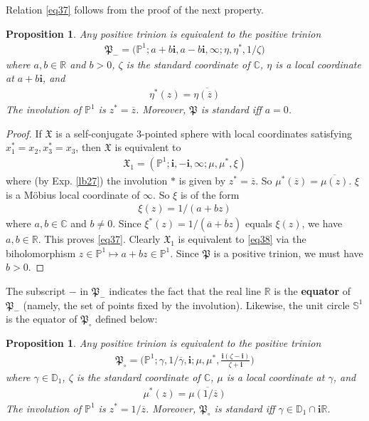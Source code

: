 \documentclass[11pt,b5paper,notitlepage]{article}
\theoremstyle{definition}
\theoremstyle{plain}
\newtheorem{pp}[df]{Proposition}
\newcommand{\fk}{\mathfrak}
\newcommand{\ovl}{\overline}
\newcommand{\im}{\mathbf{i}}
\newcommand{\Cbb}{\mathbb C}
\newcommand{\Pbb}{\mathbb P}
\newcommand{\Rbb}{\mathbb R}
\newcommand{\Dbb}{\mathbb D}
\newcommand{\Sbb}{{\mathbb S}}
\numberwithin{equation}{section}
\begin{document}
Relation \eqref{eq37} follows from the proof of the next property.

\begin{pp}\label{lb34}
Any positive trinion is equivalent to the positive trinion
\begin{align}
\fk P_-=\big(\Pbb^1;a+b\im,a-b\im,\infty;\eta,\eta^*,1/\zeta\big)  \label{eq38}
\end{align}
where $a,b\in\Rbb$ and $b>0$, $\zeta$ is the standard coordinate of $\Cbb$, $\eta$ is a local coordinate at $a+b\im$, and
\begin{align*}
\eta^*(z)=\ovl{\eta(\ovl z)}
\end{align*}
The involution of $\Pbb^1$ is $z^*=\ovl z$. Moreover, $\fk P$ is standard iff $a=0$.
\end{pp}

\begin{proof}
If $\fk X$ is a self-conjugate $3$-pointed sphere with local coordinates satisfying $x_1^*=x_2,x_3^*=x_3$, then $\fk X$ is equivalent to 
\begin{align*}
\fk X_1=(\Pbb^1;\im,-\im,\infty;\mu,\mu^*,\xi)
\end{align*}
where (by Exp. \ref{lb27}) the involution $*$ is given by $z^*=\ovl z$. So $\mu^*(\ovl z)=\ovl{\mu(z)}$. $\xi$ is a M\"obius local coordinate of $\infty$. So $\xi$ is of the form
\begin{align*}
\xi(z)=1/(a+bz)
\end{align*}
where $a,b\in\Cbb$ and $b\neq 0$. Since $\xi^*(z)=1/(\ovl a+\ovl bz)$ equals $\xi(z)$, we have $a,b\in\Rbb$. This proves \eqref{eq37}. Clearly $\fk X_1$ is equivalent to \eqref{eq38} via the biholomorphism $z\in\Pbb^1\mapsto a+bz\in\Pbb^1$. Since $\fk P$ is a positive trinion, we must have $b>0$.
\end{proof}


The subscript $-$ in $\fk P_-$ indicates the fact that the real line $\Rbb$ is the \textbf{equator} of $\fk P_-$ (namely, the set of points fixed by the involution). Likewise, the unit circle $\Sbb^1$ is the equator of $\fk P_\circ$ defined below:

\begin{pp}\label{lb35}
Any positive trinion is equivalent to the positive trinion
\begin{align}
\fk P_\circ=\Big(\Pbb^1;\gamma,1/\ovl\gamma,\im;\mu,\mu^*,\frac{\im(\zeta-\im)}{\zeta+\im}\Big) \label{eq39}
\end{align}
where $\gamma\in\Dbb_1$, $\zeta$ is the standard coordinate of $\Cbb$, $\mu$ is a local coordinate at $\gamma$, and 
\begin{align*}
\mu^*(z)=\ovl{\mu(1/\ovl z)}
\end{align*}
The involution of $\Pbb^1$ is $z^*=1/\ovl z$. Moreover, $\fk P_\circ$ is standard iff $\gamma\in\Dbb_1\cap\im\Rbb$.
\end{pp}
\end{document}
